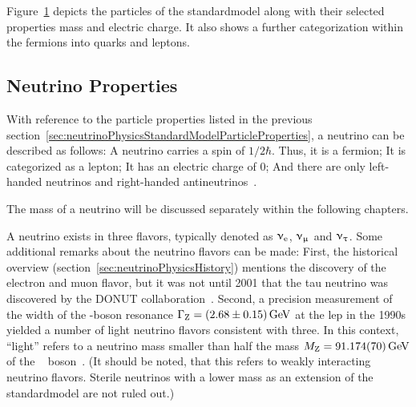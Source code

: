 Figure~\ref{fig:standardmodel} depicts the particles of the \gls{standardmodel} along with their selected properties mass and electric charge. It also shows a further categorization within the fermions into quarks and leptons.
\FloatBarrier
\begin{figure}[t]
	\begin{center}
		\def\svgwidth{\linewidth}
	\end{center}
	\label{fig:standardmodel}
\end{figure}

\subsection{Neutrino Properties}
\label{sec:neutrinoPhysicsStandardModelNeutrinos}
With reference to the particle properties listed in the previous section~\ref{sec:neutrinoPhysicsStandardModelParticleProperties}, a neutrino can be described as follows: A neutrino carries a spin of $1/2 \hbar$. Thus, it is a fermion; It is categorized as a lepton; It has an electric charge of 0; And there are only left-handed neutrinos and right-handed antineutrinos~\cite{Wouter2019}. 

The mass of a neutrino will be discussed separately within the following chapters. 

A neutrino exists in three flavors, typically denoted as $\upnu_\mathrm{e}$, $\upnu_\upmu$ and $\upnu_\uptau$. Some additional remarks about the neutrino flavors can be made: First, the historical overview (section~\ref{sec:neutrinoPhysicsHistory}) mentions the discovery of the electron and muon flavor, but it was not until 2001 that the tau neutrino was discovered by the DONUT collaboration~\cite{Kodama2000}. Second, a precision measurement of the width of the -boson resonance $\Gamma_\mathrm{Z}=\SI[separate-uncertainty=true]{2.68\pm0.15}{GeV}$ at the \gls{lep} in the 1990s yielded a number of light neutrino flavors consistent with three. In this context, ``light'' refers to a neutrino mass smaller than half the mass $M_\mathrm{Z}=\SI{91.174\pm0.070}{GeV}$ of the ~ boson~\cite{NumberOfNeutrinos}. (It should be noted, that this refers to weakly interacting neutrino flavors. Sterile neutrinos with a lower mass as an extension of the \gls{standardmodel} are not ruled out\cite{Otten:2008zz}.)

